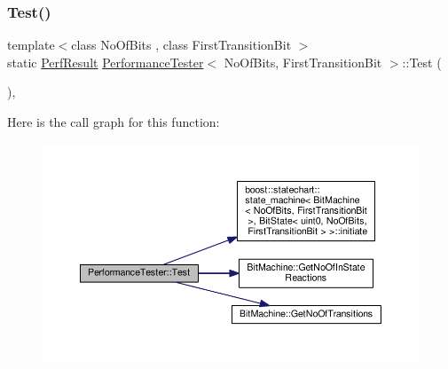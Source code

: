 \mbox{\label{class_performance_tester_a17719ca44c7bd4c9641e7723de871f73}} 
\subsubsection{\texorpdfstring{Test()}{Test()}}
{\footnotesize\ttfamily template$<$class No\+Of\+Bits , class First\+Transition\+Bit $>$ \\
static \mbox{\hyperlink{struct_perf_result}{Perf\+Result}} \mbox{\hyperlink{class_performance_tester}{Performance\+Tester}}$<$ No\+Of\+Bits, First\+Transition\+Bit $>$\+::Test (\begin{DoxyParamCaption}{ }\end{DoxyParamCaption})\hspace{0.3cm}{\ttfamily [inline]}, {\ttfamily [static]}}

Here is the call graph for this function\+:
\nopagebreak
\begin{figure}[H]
\begin{center}
\leavevmode
\includegraphics[width=350pt]{class_performance_tester_a17719ca44c7bd4c9641e7723de871f73_cgraph}
\end{center}
\end{figure}
\mbox{\label{class_performance_tester_accdf29cc546c012cd3db37a36cb555d4}} 
